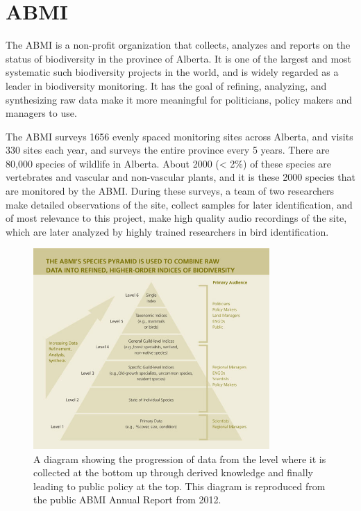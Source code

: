 \documentclass[12pt,oneside]{book}
\begin{document}
\section{ABMI}

The ABMI is a non-profit organization that collects, analyzes and
reports on the status of biodiversity in the province of Alberta.  It
is one of the largest and most systematic such biodiversity projects
in the world, and is widely regarded as a leader in biodiversity
monitoring.  It has the goal of refining, analyzing, and synthesizing
raw data make it more meaningful for politicians, policy makers and
managers to use.

The ABMI surveys 1656 evenly spaced monitoring sites across Alberta,
and visits 330 sites each year, and surveys the entire province every
5 years.  There are 80,000 species of wildlife in Alberta. About 2000
(< 2\%) of these species are vertebrates and vascular and
non-vascular plants, and it is these 2000 species that are monitored
by the ABMI.  During these surveys, a team of two researchers make
detailed observations of the site, collect samples for later
identification, and of most relevance to this project, make high
quality audio recordings of the site, which are later analyzed by
highly trained researchers in bird identification.

\begin{figure}[h]
\centering
\includegraphics[width=90mm]{figures/abmiInfoPyramid.jpg}
\caption{A diagram showing the progression of data from the level
  where it is collected at the bottom up through derived knowledge and
finally leading to public policy at the top.  This diagram is
reproduced from the public ABMI Annual Report from 2012.}
\label{fig:abmiInfoPyramid}
\end{figure}
\end{document}
